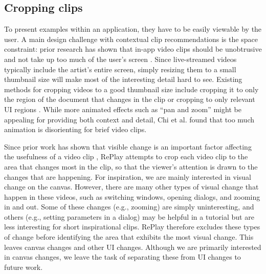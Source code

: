 \subsection{Cropping clips}
To present examples within an application, they have to be easily viewable by the user. A main design challenge with contextual clip recommendations is the space constraint: prior research has shown that in-app video clips should be unobtrusive and not take up too much of the user's screen \cite{Grossman2010a}. Since live-streamed videos typically include the artist's entire screen, simply resizing them to a small thumbnail size will make most of the interesting detail hard to see. Existing methods for cropping videos to a good thumbnail size include cropping it to only the region of the document that changes in the clip \cite{Grossman2010} or cropping to only relevant UI regions \cite{Chi2012}. While more animated effects such as ``pan and zoom'' might be appealing for providing both context and detail, Chi et al. \cite{Chi2012} found that too much animation is disorienting for brief video clips.

Since prior work has shown that visible change is an important factor affecting the usefulness of a video clip \cite{Lafreniere2014}, RePlay attempts to crop each video clip to the area that changes most in the clip, so that the viewer's attention is drawn to the changes that are happening. For inspiration, we are mainly interested in visual change on the canvas. However, there are many other types of visual change that happen in these videos, such as switching windows, opening dialogs, and zooming in and out. Some of these changes (e.g., zooming) are simply uninteresting, and others (e.g., setting parameters in a dialog) may be helpful in a tutorial but are less interesting for short inspirational clips. 
%
RePlay therefore excludes these types of change before identifying the area that exhibits the most visual change. This leaves canvas changes and other UI changes. Although we are primarily interested in canvas changes, we leave the task of separating these from UI changes to future work.

